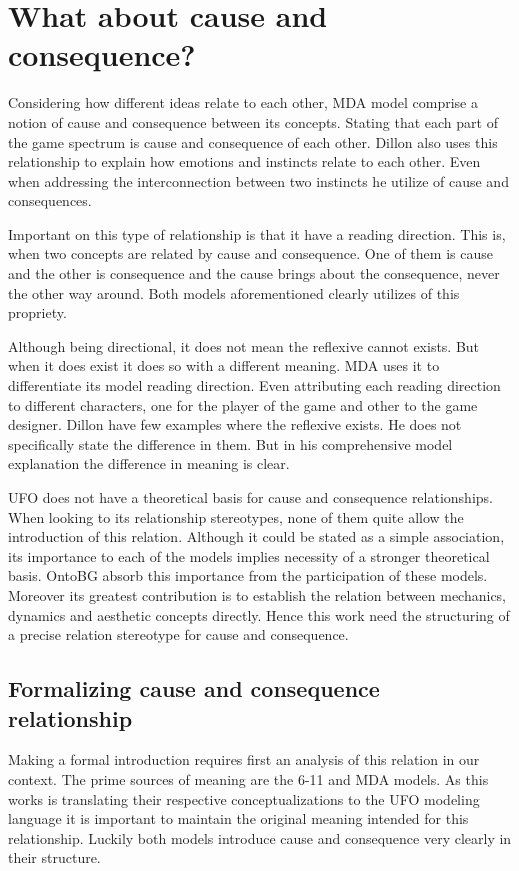 \section{What about cause and consequence?}

Considering how different ideas relate to each other, MDA model comprise a notion of cause and consequence between its concepts. Stating that each part of the game spectrum is cause and consequence of each other. Dillon also uses this relationship to explain how emotions and instincts relate to each other. Even when addressing the interconnection between two instincts he utilize of cause and consequences.

Important on this type of relationship is that it have a reading direction. This is, when two concepts are related by cause and consequence. One of them is cause and the other is consequence and the cause brings about the consequence, never the other way around. Both models aforementioned clearly utilizes of this propriety. 

Although being directional, it does not mean the reflexive cannot exists. But when it does exist it does so with a different meaning. MDA uses it to differentiate its model reading direction. Even attributing each reading direction to different characters, one for the player of the game and other to the game designer. Dillon have few examples where the reflexive exists. He does not specifically state the difference in them. But in his comprehensive model explanation the difference in meaning is clear.

UFO does not have a theoretical basis for cause and consequence relationships. When looking to its relationship stereotypes, none of them quite allow the introduction of this relation. Although it could be stated as a simple association, its importance to each of the models implies necessity of a stronger theoretical basis. OntoBG absorb this importance from the participation of these models. Moreover its greatest contribution is to establish the relation between mechanics, dynamics and aesthetic concepts directly. Hence this work need the structuring of a precise relation stereotype for cause and consequence.

\subsection{Formalizing cause and consequence relationship}

Making a formal introduction requires first an analysis of this relation in our context. The prime sources of meaning are the 6-11 and MDA models. As this works is translating their respective conceptualizations to the UFO modeling language it is important to maintain the original meaning intended for this relationship. Luckily both models introduce cause and consequence very clearly in their structure. 